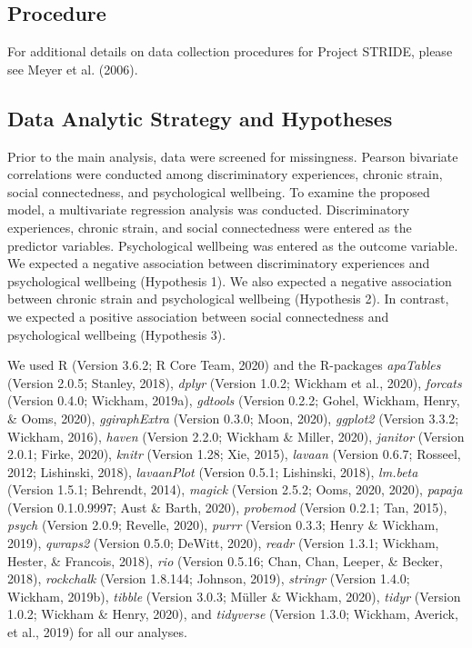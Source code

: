 \documentclass[
  english,
  man,floatsintext]{apa6}
\begin{document}
\hypertarget{procedure}{%
\subsection{Procedure}\label{procedure}}

For additional details on data collection procedures for Project STRIDE, please see Meyer et al. (2006).

\hypertarget{data-analytic-strategy-and-hypotheses}{%
\subsection{Data Analytic Strategy and Hypotheses}\label{data-analytic-strategy-and-hypotheses}}

Prior to the main analysis, data were screened for missingness. Pearson bivariate correlations were conducted among discriminatory experiences, chronic strain, social connectedness, and psychological wellbeing. To examine the proposed model, a multivariate regression analysis was conducted. Discriminatory experiences, chronic strain, and social connectedness were entered as the predictor variables. Psychological wellbeing was entered as the outcome variable. We expected a negative association between discriminatory experiences and psychological wellbeing (Hypothesis 1). We also expected a negative association between chronic strain and psychological wellbeing (Hypothesis 2). In contrast, we expected a positive association between social connectedness and psychological wellbeing (Hypothesis 3).

We used R (Version 3.6.2; R Core Team, 2020) and the R-packages \emph{apaTables} (Version 2.0.5; Stanley, 2018), \emph{dplyr} (Version 1.0.2; Wickham et al., 2020), \emph{forcats} (Version 0.4.0; Wickham, 2019a), \emph{gdtools} (Version 0.2.2; Gohel, Wickham, Henry, \& Ooms, 2020), \emph{ggiraphExtra} (Version 0.3.0; Moon, 2020), \emph{ggplot2} (Version 3.3.2; Wickham, 2016), \emph{haven} (Version 2.2.0; Wickham \& Miller, 2020), \emph{janitor} (Version 2.0.1; Firke, 2020), \emph{knitr} (Version 1.28; Xie, 2015), \emph{lavaan} (Version 0.6.7; Rosseel, 2012; Lishinski, 2018), \emph{lavaanPlot} (Version 0.5.1; Lishinski, 2018), \emph{lm.beta} (Version 1.5.1; Behrendt, 2014), \emph{magick} (Version 2.5.2; Ooms, 2020, 2020), \emph{papaja} (Version 0.1.0.9997; Aust \& Barth, 2020), \emph{probemod} (Version 0.2.1; Tan, 2015), \emph{psych} (Version 2.0.9; Revelle, 2020), \emph{purrr} (Version 0.3.3; Henry \& Wickham, 2019), \emph{qwraps2} (Version 0.5.0; DeWitt, 2020), \emph{readr} (Version 1.3.1; Wickham, Hester, \& Francois, 2018), \emph{rio} (Version 0.5.16; Chan, Chan, Leeper, \& Becker, 2018), \emph{rockchalk} (Version 1.8.144; Johnson, 2019), \emph{stringr} (Version 1.4.0; Wickham, 2019b), \emph{tibble} (Version 3.0.3; Müller \& Wickham, 2020), \emph{tidyr} (Version 1.0.2; Wickham \& Henry, 2020), and \emph{tidyverse} (Version 1.3.0; Wickham, Averick, et al., 2019) for all our analyses.
\end{document}
